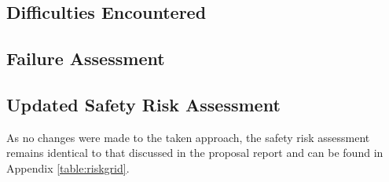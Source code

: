 
\iffalse


\fi

\subsection{Difficulties Encountered}



\subsection{Failure Assessment}



\subsection{Updated Safety Risk Assessment}

As no changes were made to the taken approach, the safety risk assessment remains identical to that discussed in the proposal report \autocite{proposal_report} and can be found in Appendix \ref{table:riskgrid}. 